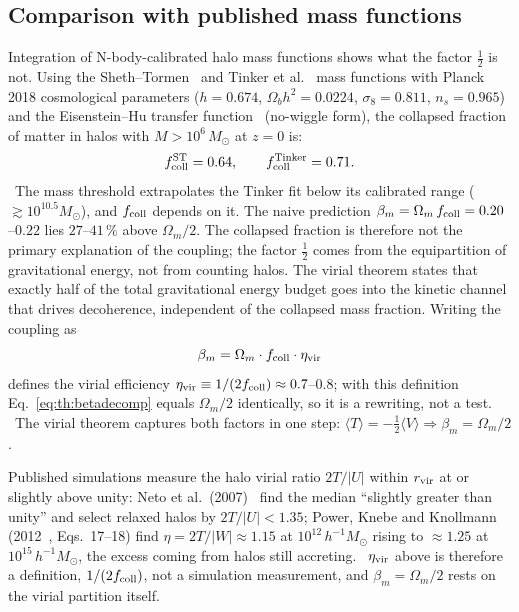 \subsection{Comparison with published mass functions}
Integration of N-body-calibrated halo mass functions shows what the factor $\tfrac12$ is not. Using the Sheth--Tormen~\cite{ShethTormen1999} and Tinker et
al.~\cite{Tinker2008} mass functions with Planck 2018 cosmological parameters ($h=0.674$, $\Omega_bh^2=0.0224$, $\sigma_8=0.811$, $n_s=0.965$) and the
Eisenstein--Hu transfer function~\cite{EisensteinHu1998} (no-wiggle form), the collapsed fraction of matter in halos with $M>10^6\,M_\odot$ at $z=0$ is:
\begin{equation}f^{\rm ST}_{\rm coll}=0.64,\qquad f^{\rm Tinker}_{\rm coll}=0.71 .\label{eq:th:fcoll}\end{equation}
\calc\ The mass threshold extrapolates the Tinker fit below its calibrated range ($\gtrsim10^{10.5}M_\odot$), and $f_{\rm coll}$ depends on it.
The naive prediction $\beta_m=\Omega_m\,f_{\rm coll}=0.20$--$0.22$ lies $27$--$41\,\%$ above $\Omega_m/2$. The collapsed fraction is therefore not the
primary explanation of the coupling; the factor $\tfrac12$ comes from the equipartition of gravitational energy, not from counting halos. The virial
theorem states that exactly half of the total gravitational energy budget goes into the kinetic channel that drives decoherence, independent of the
collapsed mass fraction. Writing the coupling as
\begin{equation}\beta_m=\Omega_m\cdot f_{\rm coll}\cdot\eta_{\rm vir}\label{eq:th:betadecomp}\end{equation}
defines the virial efficiency $\eta_{\rm vir}\equiv1/(2f_{\rm coll})\approx0.7$--$0.8$; with this definition Eq.~\eqref{eq:th:betadecomp} equals
$\Omega_m/2$ identically, so it is a rewriting, not a test. \derived\ The virial theorem captures both factors in one step:
$\langle T\rangle=-\tfrac12\langle V\rangle\Rightarrow\beta_m=\Omega_m/2$.

Published simulations measure the halo virial ratio $2T/|U|$ within $r_{\rm vir}$ at or slightly above unity: Neto et al.\ (2007)~\cite{Neto2007}
find the median ``slightly greater than unity'' and select relaxed halos by $2T/|U|<1.35$; Power, Knebe and Knollmann (2012~\cite{Power2012}, Eqs.~17--18) find
$\eta=2T/|W|\approx1.15$ at $10^{12}\,h^{-1}M_\odot$ rising to $\approx1.25$ at $10^{15}\,h^{-1}M_\odot$, the excess coming from halos still accreting.
\observed\ $\eta_{\rm vir}$ above is therefore a definition, $1/(2f_{\rm coll})$, not a simulation measurement, and $\beta_m=\Omega_m/2$ rests on the
virial partition itself.

